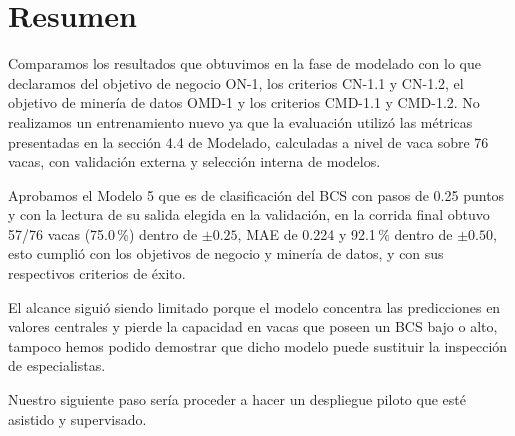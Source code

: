 \section*{Resumen}

Comparamos los resultados que obtuvimos en la fase de modelado con lo que declaramos del objetivo de negocio ON-1, los criterios CN-1.1 y CN-1.2, el objetivo de minería de datos OMD-1 y los criterios CMD-1.1 y CMD-1.2. No realizamos un entrenamiento nuevo ya que la evaluación utilizó las métricas presentadas en la sección 4.4 de Modelado, calculadas a nivel de vaca sobre 76 vacas, con validación externa y selección interna de modelos.

Aprobamos el Modelo 5 que es de clasificación del BCS con pasos de 0.25 puntos y con la lectura de su salida elegida en la validación, en la corrida final obtuvo 57/76 vacas (75.0\,\%) dentro de $\pm0.25$, MAE de 0.224 y 92.1\,\% dentro de $\pm0.50$, esto cumplió con los objetivos de negocio y minería de datos, y con sus respectivos criterios de éxito.

El alcance siguió siendo limitado porque el modelo concentra las predicciones en valores centrales y pierde la capacidad en vacas que poseen un BCS bajo o alto, tampoco hemos podido demostrar que dicho modelo puede sustituir la inspección de especialistas.

Nuestro siguiente paso sería proceder a hacer un despliegue piloto que esté asistido y supervisado.
